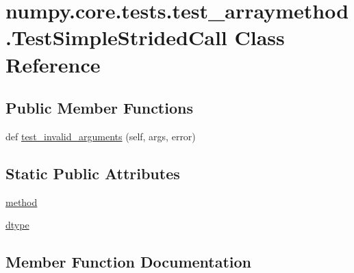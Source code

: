 \hypertarget{classnumpy_1_1core_1_1tests_1_1test__arraymethod_1_1TestSimpleStridedCall}{}\section{numpy.\+core.\+tests.\+test\+\_\+arraymethod.\+Test\+Simple\+Strided\+Call Class Reference}
\label{classnumpy_1_1core_1_1tests_1_1test__arraymethod_1_1TestSimpleStridedCall}
\subsection*{Public Member Functions}
\begin{DoxyCompactItemize}
\item 
def \hyperlink{classnumpy_1_1core_1_1tests_1_1test__arraymethod_1_1TestSimpleStridedCall_a8c5a9070655cfefb5367e9d352bb6508}{test\+\_\+invalid\+\_\+arguments} (self, args, error)
\end{DoxyCompactItemize}
\subsection*{Static Public Attributes}
\begin{DoxyCompactItemize}
\item 
\hyperlink{classnumpy_1_1core_1_1tests_1_1test__arraymethod_1_1TestSimpleStridedCall_a0e425a943293733c99aec4df5b003b9a}{method}
\item 
\hyperlink{classnumpy_1_1core_1_1tests_1_1test__arraymethod_1_1TestSimpleStridedCall_a5eb773f7df847134fb9a2374f4bc912c}{dtype}
\end{DoxyCompactItemize}


\subsection{Member Function Documentation}
\mbox{\label{classnumpy_1_1core_1_1tests_1_1test__arraymethod_1_1TestSimpleStridedCall_a8c5a9070655cfefb5367e9d352bb6508}} 
